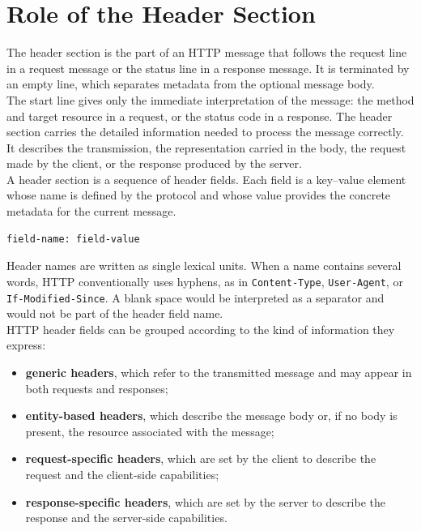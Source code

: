 \documentclass{scrbook}
\begin{document}
\section{Role of the Header Section}

The header section is the part of an HTTP message that follows the request line in a request message or the status line in a response message. It is terminated by an empty line, which separates metadata from the optional message body.\\

The start line gives only the immediate interpretation of the message: the method and target resource in a request, or the status code in a response. The header section carries the detailed information needed to process the message correctly. It describes the transmission, the representation carried in the body, the request made by the client, or the response produced by the server.\\

A header section is a sequence of header fields. Each field is a key--value element whose name is defined by the protocol and whose value provides the concrete metadata for the current message.

\begin{lstlisting}
field-name: field-value
\end{lstlisting}

Header names are written as single lexical units. When a name contains several words, HTTP conventionally uses hyphens, as in \texttt{Content-Type}, \texttt{User-Agent}, or \texttt{If-Modified-Since}. A blank space would be interpreted as a separator and would not be part of the header field name.\\

HTTP header fields can be grouped according to the kind of information they express:
\begin{itemize}
    \item \textbf{generic headers}, which refer to the transmitted message and may appear in both requests and responses;
    \item \textbf{entity-based headers}, which describe the message body or, if no body is present, the resource associated with the message;
    \item \textbf{request-specific headers}, which are set by the client to describe the request and the client-side capabilities;
    \item \textbf{response-specific headers}, which are set by the server to describe the response and the server-side capabilities.
\end{itemize}
\end{document}
